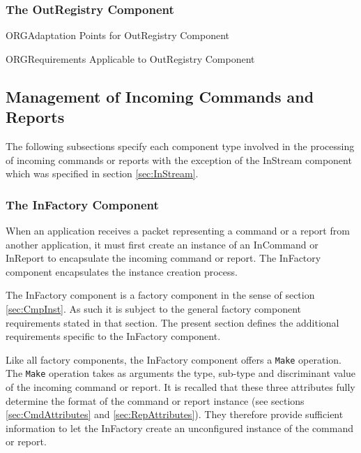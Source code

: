 \documentclass{pnp_article}
\begin{document}
\subsubsection{The OutRegistry Component}\label{sec:OutRegistry}


\begin{crAp}{ORG}{Adaptation Points for OutRegistry Component}
\end{crAp}

\begin{crReq}{ORG}{Requirements Applicable to OutRegistry Component}
\end{crReq}

\subsection{Management of Incoming Commands and Reports}\label{sec:ManagementOfIncomingCmdAndRep}


The following subsections specify each component type involved in the processing of incoming commands or reports with the exception of the InStream component which was specified in section \ref{sec:InStream}. 

\subsubsection{The InFactory Component}\label{sec:InFactory}

When an application receives a packet representing a command or a report from another application, it must first create an instance of an InCommand or InReport to encapsulate the incoming command or report. The InFactory component encapsulates the instance creation process.

The InFactory component is a factory component in the sense of section \ref{sec:CmpInst}. As such it is subject to the general factory component requirements stated in that section. The present section defines the additional requirements specific to the InFactory component.

Like all factory components, the InFactory component offers a \texttt{Make} operation. The \texttt{Make} operation takes as arguments the type, sub-type and discriminant value of the incoming command or report. It is recalled that these three attributes fully determine the format of the command or report instance (see sections \ref{sec:CmdAttributes} and \ref{sec:RepAttributes}). They therefore provide sufficient information to let the InFactory create an unconfigured instance of the command or report.
\end{document}
